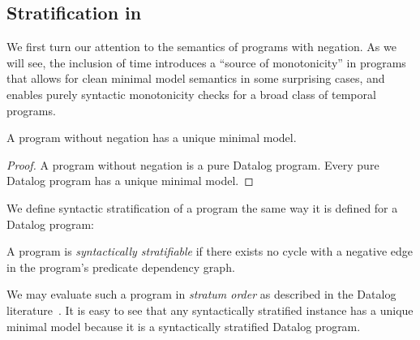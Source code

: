 
\subsection{Stratification in {\large{\bf\slang}}}
\label{sec:strat}
We first turn our attention to the semantics of
programs with negation.  As we will see, the inclusion of time introduces a
``source of monotonicity'' in programs that allows for clean minimal model
semantics in some surprising cases, and enables purely syntactic monotonicity
checks for a broad class of temporal programs.





\begin{lemma} \label{lemma:no-neg-unique}
%
A \slang program without negation 
has a unique minimal model.
%
\end{lemma}

\begin{proof} 
%
A \slang program without negation 
is a pure Datalog
program.  Every pure Datalog program has a unique minimal model. 
%
\end{proof}



We define syntactic stratification of a \slang program the same way it is
defined for a Datalog program:

\begin{definition}
%
A \slang program is \emph{syntactically stratifiable} if there
exists no cycle with a negative edge 
in the program's
predicate dependency graph.
%
\end{definition}


We may evaluate such a program in {\em stratum order} as described in the
Datalog literature~\cite{ullmanbook}.
It is easy to see that any syntactically stratified \slang instance has a
unique minimal model because it is a syntactically stratified Datalog program.

